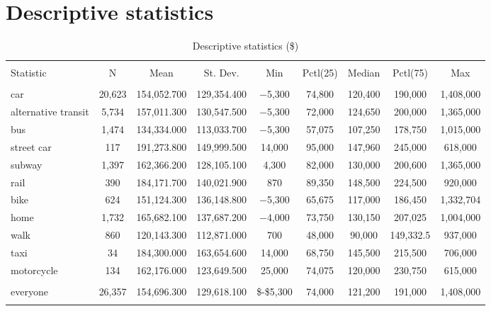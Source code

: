 \documentclass[10pt,a4paper]{article}
\begin{document}
\section*{Descriptive statistics}
\begin{table}[!htbp] \centering 
  \caption{Descriptive statistics (\$)} 
  \label{} 
\begin{tabular}{@{\extracolsep{5pt}}lcccccccc} 
\\[-1.8ex]\hline 
\hline \\[-1.8ex] 
Statistic & \multicolumn{1}{c}{N} & \multicolumn{1}{c}{Mean} & \multicolumn{1}{c}{St. Dev.} & \multicolumn{1}{c}{Min} & \multicolumn{1}{c}{Pctl(25)} & \multicolumn{1}{c}{Median} & \multicolumn{1}{c}{Pctl(75)} & \multicolumn{1}{c}{Max} \\ 
\hline \\[-1.8ex] 
car & 20,623 & 154,052.700 & 129,354.400 & $-$5,300 & 74,800 & 120,400 & 190,000 & 1,408,000 \\ 
alternative transit & 5,734 & 157,011.300 & 130,547.500 & $-$5,300 & 72,000 & 124,650 & 200,000 & 1,365,000 \\ 
bus & 1,474 & 134,334.000 & 113,033.700 & $-$5,300 & 57,075 & 107,250 & 178,750 & 1,015,000 \\ 
street car & 117 & 191,273.800 & 149,999.500 & 14,000 & 95,000 & 147,960 & 245,000 & 618,000 \\ 
subway & 1,397 & 162,366.200 & 128,105.100 & 4,300 & 82,000 & 130,000 & 200,600 & 1,365,000 \\ 
rail & 390 & 184,171.700 & 140,021.900 & 870 & 89,350 & 148,500 & 224,500 & 920,000 \\ 
bike & 624 & 151,124.300 & 136,148.800 & $-$5,300 & 65,675 & 117,000 & 186,450 & 1,332,704 \\ 
home & 1,732 & 165,682.100 & 137,687.200 & $-$4,000 & 73,750 & 130,150 & 207,025 & 1,004,000 \\
walk  & 860 & 120,143.300 & 112,871.000 & 700 & 48,000 & 90,000 & 149,332.5 & 937,000 \\ 
taxi & 34 & 184,300.000 & 163,654.600 & 14,000 & 68,750 & 145,500 & 215,500 & 706,000 \\
motorcycle & 134 & 162,176.000 & 123,649.500 & 25,000 & 74,075 & 120,000 & 230,750 & 615,000 \\ 
\hline \\[-1.8 ex]
everyone & 26,357 & 154,696.300 & 129,618.100 & \$-\$5,300 & 74,000 & 121,200 & 191,000 & 1,408,000 \\
\hline \\[-1.8ex] 
\end{tabular} 
\end{table}
\end{document}

